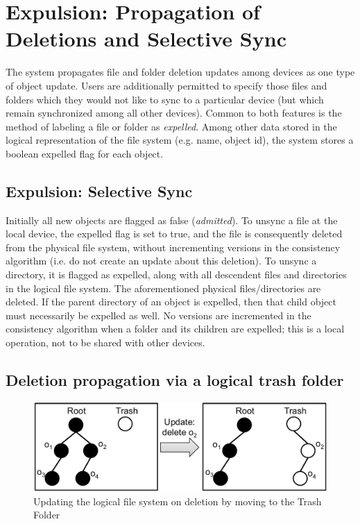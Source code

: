 \section*{Expulsion: Propagation of Deletions and Selective Sync}
\label{sec:expulsion}

The system propagates file and folder deletion updates among devices as one type
of object update. Users are additionally permitted to specify those files and
folders which they would not like to sync to a particular device (but which
remain synchronized among all other devices). Common to both features is the
method of labeling a file or folder as {\em expelled}. Among other data stored
in the logical representation of the file system (e.g. name, object id), the
system stores a boolean expelled flag for each object.

\subsection*{Expulsion: Selective Sync}
Initially all new objects are flagged as false ({\em admitted}). To unsync a
file at the local device, the expelled flag is set to true, and the file is
consequently deleted from the physical file system, without incrementing
versions in the consistency algorithm (i.e. do not create an update about this
deletion). To unsync a directory, it is flagged as expelled, along with all
descendent files and directories in the logical file system. The aforementioned
physical files/directories are deleted. If the parent directory of an object is
expelled, then that child object must necessarily be expelled as well. No
versions are incremented in the consistency algorithm when a folder and its
children are expelled; this is a local operation, not to be shared with other
devices.


\subsection*{Deletion propagation via a logical trash folder}

\begin{figure}[t]
\centering
\includegraphics[width=\textwidth]{figs/trash.pdf}
\caption{Updating the logical file system on deletion by moving to the Trash
Folder}
\label{fig:trashfolder}
\end{figure}

